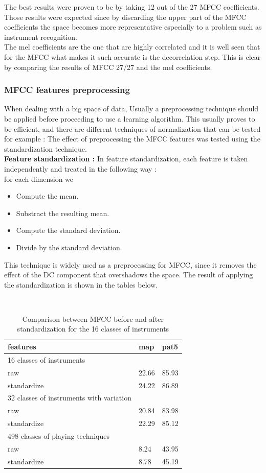 \documentclass[hidelinks,12pt]{report}
\begin{document}
The best results were proven to be by taking 12 out of the 27 MFCC coefficients. Those results were expected since by discarding the upper part of the MFCC coefficients the space becomes more representative especially to a problem such as instrument recognition.\\ The mel coefficients are the one that are highly correlated and it is well seen that for the MFCC what makes it such accurate is the decorrelation step. This is clear by comparing the results of MFCC 27/27 and the mel coefficients.

\subsubsection{MFCC features preprocessing}
When dealing with a big space of data, Usually a preprocessing technique should be applied before proceeding to use a learning algorithm. This usually proves to be efficient, and there are  different techniques of normalization that can be tested for example :   The effect of preprocessing the MFCC features was tested using the standardization technique.\\
\textbf{Feature standardization :}
In feature standardization, each feature is taken independently and treated in the following way : \\
for each dimension we
\begin{itemize}
\item Compute the mean.
\item Substract the resulting mean.
\item Compute the standard deviation.
\item Divide by the standard deviation.
\end{itemize}
This technique is widely used as a preprocessing for MFCC, since it removes the effect of the DC component that overshadows the space. The result of applying the standardization is shown in the tables below.
\begin{table}[H] 
\begin{center} 
\ 
 \setlength{\tabcolsep}{.16667em} 
\begin{tabular}{|l|l|l|} 
\hline
features & map & pat5  \\ 
\hline
\hline
16 classes of instruments    \\ 
\hline 
raw & 22.66 & 85.93  \\ 
standardize & 24.22 & 86.89  \\  

 \hline
 32 classes of instruments with variation \\

\hline 
raw & 20.84 & 83.98 \\ 
standardize & 22.29 & 85.12  \\ 


\hline 
498 classes of playing techniques \\
\hline
raw & 8.24 & 43.95  \\ 
standardize & 8.78 & 45.19  \\ \hline 
\end{tabular} 
\end{center} 
\caption{Comparison between MFCC before and after standardization for the 16 classes of instruments} 
\label{me} 
\end{table}
\end{document}
